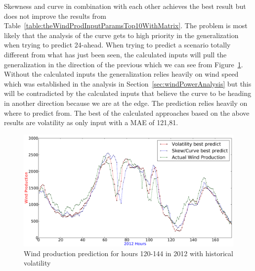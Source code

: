 Skewness and curve in combination with each other achieves the best result but does not improve the results from Table~\ref{table:theWindProdInputParamsTop10WithMatrix}. The problem is most likely that the analysis of the curve gets to high priority in the generalization when trying to predict 24-ahead. When trying to predict a scenario totally different from what has just been seen, the calculated inputs will pull the generalization in the direction of the previous which we can see from Figure~\ref{fig:bestStatisticalApproachGraph}. Without the calculated inputs the generalization relies heavily on wind speed which was established in the analysis in Section~\ref{sec:windPowerAnalysis} but this will be contradicted by the calculated inputs that believe the curve to be heading in another direction because we are at the edge. The prediction relies heavily on where to predict from. The best of the calculated approaches based on the above results are volatility as only input with a MAE of 121,81.

\begin{figure}[H]
\centering
\includegraphics[width=0.99\linewidth]{billeder/bestStatisticalApproachGraph.png}
\caption{Wind production prediction for hours 120-144 in 2012 with historical volatility}
\label{fig:bestStatisticalApproachGraph}
\end{figure} 

